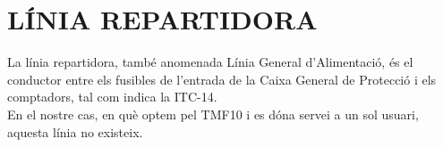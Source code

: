 \chapter{\uppercase{Línia repartidora}}
La línia repartidora, també anomenada Línia General d'Alimentació, és el conductor entre els fusibles de l'entrada de la Caixa General de Protecció i els comptadors, tal com indica la ITC-14.\\
\newline En el nostre cas, en què optem pel TMF10 i es dóna servei a un sol usuari, aquesta línia no existeix.
\clearpage